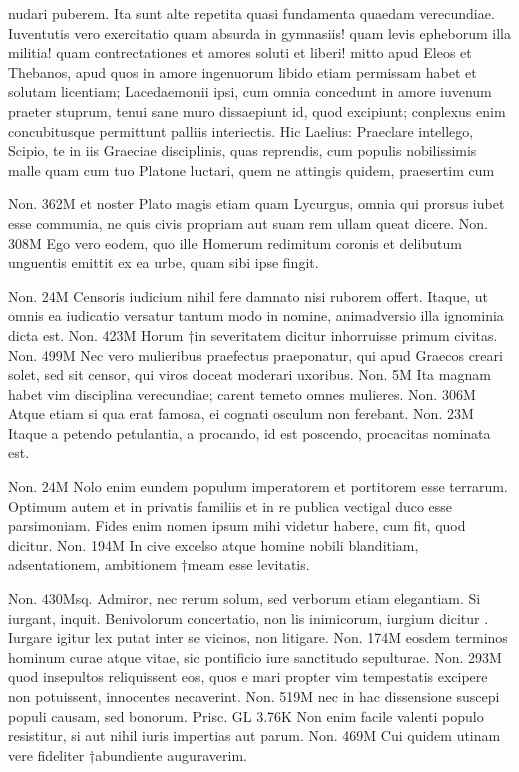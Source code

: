  nudari puberem. Ita sunt alte repetita quasi fundamenta quaedam verecundiae. Iuventutis vero exercitatio quam absurda in gymnasiis! quam levis epheborum illa militia! quam contrectationes et amores soluti et liberi! mitto apud Eleos et Thebanos, apud quos in amore ingenuorum libido etiam permissam habet et solutam licentiam; Lacedaemonii ipsi, cum omnia concedunt in amore iuvenum praeter stuprum, tenui sane muro dissaepiunt id, quod excipiunt; conplexus enim concubitusque permittunt palliis interiectis. Hic Laelius: Praeclare intellego, Scipio, te in iis Graeciae disciplinis, quas reprendis, cum populis nobilissimis malle quam cum tuo Platone luctari, quem ne attingis quidem, praesertim cum

 Non. 362M et noster Plato magis etiam quam Lycurgus, omnia qui prorsus iubet esse communia, ne quis civis propriam aut suam rem ullam queat dicere. Non. 308M Ego vero eodem, quo ille Homerum redimitum coronis et delibutum unguentis emittit ex ea urbe, quam sibi ipse fingit.

 Non. 24M Censoris iudicium nihil fere damnato nisi ruborem offert. Itaque, ut omnis ea iudicatio versatur tantum modo in nomine, animadversio illa ignominia dicta est. Non. 423M Horum †in severitatem dicitur inhorruisse primum civitas. Non. 499M Nec vero mulieribus praefectus praeponatur, qui apud Graecos creari solet, sed sit censor, qui viros doceat moderari uxoribus. Non. 5M Ita magnam habet vim disciplina verecundiae; carent temeto omnes mulieres. Non. 306M Atque etiam si qua erat famosa, ei cognati osculum non ferebant. Non. 23M Itaque a petendo petulantia, a procando, id est poscendo, procacitas nominata est.

 Non. 24M Nolo enim eundem populum imperatorem et portitorem esse terrarum. Optimum autem et in privatis familiis et in re publica vectigal duco esse parsimoniam. Fides enim nomen ipsum mihi videtur habere, cum fit, quod dicitur. Non. 194M In cive excelso atque homine nobili blanditiam, adsentationem, ambitionem †meam esse levitatis.

 Non. 430Msq. Admiror, nec rerum solum, sed verborum etiam elegantiam. Si iurgant, inquit. Benivolorum concertatio, non lis inimicorum, iurgium dicitur . Iurgare igitur lex putat inter se vicinos, non litigare. Non. 174M eosdem terminos hominum curae atque vitae, sic pontificio iure sanctitudo sepulturae. Non. 293M quod insepultos reliquissent eos, quos e mari propter vim tempestatis excipere non potuissent, innocentes necaverint. Non. 519M nec in hac dissensione suscepi populi causam, sed bonorum. Prisc. GL 3.76K Non enim facile valenti populo resistitur, si aut nihil iuris impertias aut parum. Non. 469M Cui quidem utinam vere fideliter †abundiente auguraverim.

